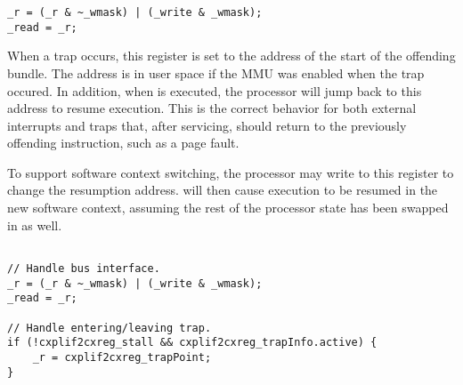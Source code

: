 \declaration{}
\implementation{}
\begin{lstlisting}
_r = (_r & ~_wmask) | (_write & _wmask);
_read = _r;
\end{lstlisting}




When a trap occurs, this register is set to the address of the start of the
offending bundle. The address is in user space if the MMU was enabled when the
trap occured. In addition, when  is executed, the processor will jump
back to this address to resume execution. This is the correct behavior for both
external interrupts and traps that, after servicing, should return to the
previously offending instruction, such as a page fault.

To support software context switching, the processor may write to this register
to change the resumption address.  will then cause execution to be
resumed in the new software context, assuming the rest of the processor state
has been swapped in as well.

\declaration{}
\implementation{}
\begin{lstlisting}

// Handle bus interface.
_r = (_r & ~_wmask) | (_write & _wmask);
_read = _r;

// Handle entering/leaving trap.
if (!cxplif2cxreg_stall && cxplif2cxreg_trapInfo.active) {
    _r = cxplif2cxreg_trapPoint;
}

\end{lstlisting}


